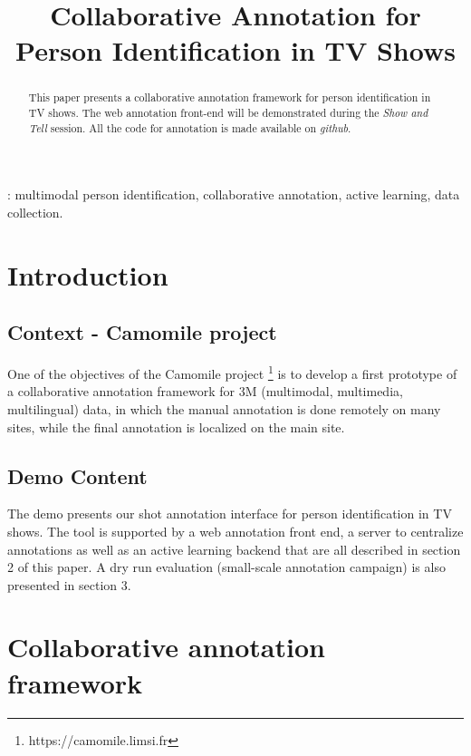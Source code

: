 \documentclass[a4paper]{article}
\title{Collaborative Annotation for Person Identification in TV Shows}
\begin{document}
  \maketitle
  \begin{abstract}
This paper presents a collaborative annotation framework for person identification in TV shows. The web annotation front-end will be demonstrated during the \textit{Show and Tell} session. All the code for annotation is made available on \textit{github}.
  \end{abstract}
  : multimodal person identification, collaborative annotation, active learning, data collection.

  \section{Introduction}
      \subsection{Context - Camomile project}
One of the objectives of the Camomile project \footnote{https://camomile.limsi.fr} is to develop a first prototype of a collaborative annotation framework for 3M (multimodal, multimedia, multilingual) data, in which the manual annotation is done remotely on many sites, while the final annotation is localized on the main site. 

        \vspace{-0.2cm}
 \subsection{Demo Content}
The demo presents our shot annotation interface for person identification in TV shows. The tool is supported by a web annotation front end, a server to centralize annotations as well as an active learning backend that are all described in section 2 of this paper. A dry run evaluation (small-scale annotation campaign) is also presented in section 3.


      \section{Collaborative annotation framework}
\end{document}
